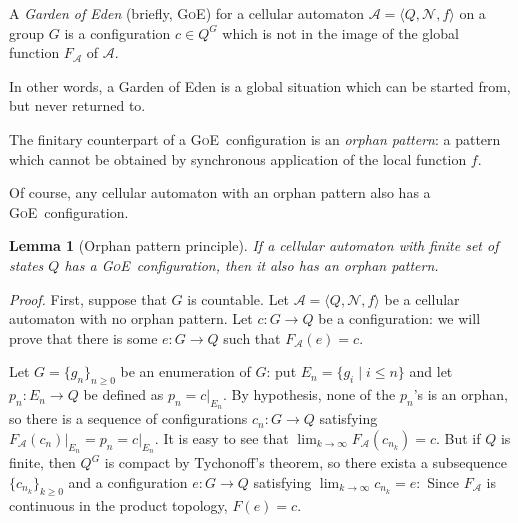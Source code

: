 \documentclass[12pt]{article}
\begin{document}
\newcommand{\Acal}{\ensuremath{\mathcal{A}}}
\newcommand{\goe}{\textsc{GoE}}
\newcommand{\Neigh}{\ensuremath{\mathcal{N}}}
\newcommand{\restrict}[2]{\ensuremath{\left.{#1}\right|_{#2}}}

\newtheorem{lemma}{Lemma}

A \emph{Garden of Eden} (briefly, \goe)
for a cellular automaton
\begin{math}
\Acal = \langle Q, \Neigh, f \rangle
\end{math}
on a group $G$
is a configuration $c \in Q^G$
which is not in the image of the global function $F_\Acal$ of $\Acal$.

In other words, a Garden of Eden is a global situation
which can be started from, but never returned to.

The finitary counterpart of a \goe\ configuration
is an \emph{orphan pattern}:
a pattern which cannot be obtained
by synchronous application of the local function $f$.

Of course,
any cellular automaton with an orphan pattern
also has a \goe\ configuration.
\begin{lemma}[Orphan pattern principle] \label{lem:opp}
If a cellular automaton with finite set of states $Q$
has a \goe\ configuration,
then it also has an orphan pattern.
\end{lemma}
\textit{Proof.}
First, suppose that $G$ is countable.
Let
\begin{math}
\Acal = \langle Q, \Neigh, f \rangle
\end{math}
be a cellular automaton with no orphan pattern.
Let $c : G \to Q$ be a configuration:
we will prove that there is some $e : G \to Q$
such that $F_\Acal(e) = c$.

Let
\begin{math}
G = \{g_n\}_{n \geq 0}
\end{math}
be an enumeration of $G$:
put $E_n = \{g_i \mid i \leq n\}$
and let $p_n : E_n \to Q$ be defined as
\begin{math}
p_n = \restrict{c}{E_n}.
\end{math}
By hypothesis, none of the $p_n$'s is an orphan,
so there is a sequence of configurations
$c_n : G \to Q$
satisfying
\begin{math}
\restrict{F_\Acal(c_n)}{E_n} = p_n = \restrict{c}{E_n}.
\end{math}
It is easy to see that
\begin{math}
\lim_{k \to \infty} F_\Acal(c_{n_k}) = c.
\end{math}
But if $Q$ is finite,
then $Q^G$ is compact by Tychonoff's theorem,
so there exista a subsequence
\begin{math}
\{ c_{n_k} \}_{k \geq 0}
\end{math}
and a configuration $e : G \to Q$ satisfying
\begin{math}
\lim_{k \to \infty} c_{n_k} = e:
\end{math}
Since $F_\Acal$ is continuous in the product topology, $F(e) = c$.
\end{document}
